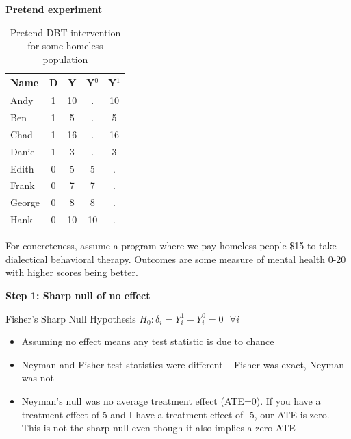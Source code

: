\documentclass[notes=show]{beamer}
\begin{document}
\begin{frame}[plain]
\begin{center}
\textbf{Pretend experiment}
\end{center}

\begin{table}[htbp]\centering
\begin{center}
\caption{Pretend DBT intervention for some homeless population}
\begin{threeparttable}
\begin{tabular}{lcccc}
\toprule
\multicolumn{1}{l}{Name}&
\multicolumn{1}{c}{D}&
\multicolumn{1}{c}{Y}&
\multicolumn{1}{c}{Y$^0$}&
\multicolumn{1}{c}{Y$^1$}\\
\midrule
Andy		& 1 & 10  & . & 10 \\
Ben		& 1 & 5    & . & 5 \\
Chad	& 1 & 16  & . & 16 \\	
Daniel	& 1 &  3   & . & 3 \\
Edith		& 0 & 5    & 5 & . \\
Frank	& 0 & 7    & 7&.  \\
George	& 0 & 8    & 8 & . \\
Hank		& 0 & 10  & 10 & . \\
\bottomrule
\end{tabular}
\end{threeparttable}
\end{center}
\end{table}

For concreteness, assume a program where we pay homeless people \$15 to take dialectical behavioral therapy. Outcomes are some measure of mental health 0-20 with higher scores being better. 
	
\end{frame}



\begin{frame}[plain]
\begin{center}
\textbf{Step 1: Sharp null of no effect}
\end{center}

\begin{block}{Fisher's Sharp Null Hypothesis}
$H_0: \delta_i = Y_i^1 - Y_i^0 = 0 \text{ } \forall i$
\end{block}

\begin{itemize}
\item Assuming no effect means any test statistic is due to chance
\item Neyman and Fisher test statistics were different -- Fisher was exact, Neyman was not
\item Neyman's null was no average treatment effect (ATE=0). If you have a treatment effect of 5 and I have a treatment effect of -5, our ATE is zero. This is not the sharp null even though it also implies a zero ATE

\end{itemize}

\end{frame}
\end{document}
